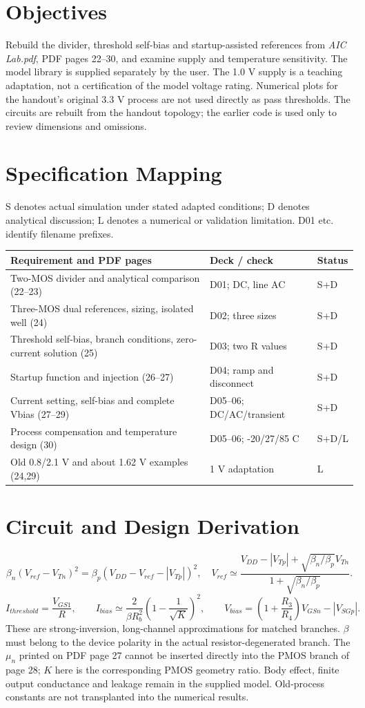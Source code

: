 \section{Objectives}
Rebuild the divider, threshold self-bias and startup-assisted references from \textit{AIC Lab.pdf}, PDF pages 22--30, and examine supply and temperature sensitivity. The model library is supplied separately by the user. The 1.0 V supply is a teaching adaptation, not a certification of the model voltage rating. Numerical plots for the handout's original 3.3 V process are not used directly as pass thresholds. The circuits are rebuilt from the handout topology; the earlier code is used only to review dimensions and omissions.

\section{Specification Mapping}
S denotes actual simulation under stated adapted conditions; D denotes analytical discussion; L denotes a numerical or validation limitation. D01 etc. identify filename prefixes.
\small\begin{longtable}{p{.46\linewidth}p{.30\linewidth}p{.15\linewidth}}\toprule
Requirement and PDF pages & Deck / check & Status \\ \midrule\endhead
Two-MOS divider and analytical comparison (22--23) & D01; DC, line AC & S+D \\
Three-MOS dual references, sizing, isolated well (24) & D02; three sizes & S+D \\
Threshold self-bias, branch conditions, zero-current solution (25) & D03; two R values & S+D \\
Startup function and injection (26--27) & D04; ramp and disconnect & S+D \\
Current setting, self-bias and complete Vbias (27--29) & D05--06; DC/AC/transient & S+D \\
Process compensation and temperature design (30) & D05--06; -20/27/85 C & S+D/L \\
Old 0.8/2.1 V and about 1.62 V examples (24,29) & 1 V adaptation & L \\
\bottomrule\end{longtable}\normalsize


\section{Circuit and Design Derivation}
\[
\beta_n(V_{ref}-V_{Tn})^2=\beta_p(V_{DD}-V_{ref}-|V_{Tp}|)^2,
\quad
V_{ref}\simeq\frac{V_{DD}-|V_{Tp}|+\sqrt{\beta_n/\beta_p}V_{Tn}}{1+\sqrt{\beta_n/\beta_p}}.
\]
\[
I_{threshold}=\frac{V_{GS1}}{R},\qquad
I_{bias}\simeq\frac{2}{\beta R_b^2}\left(1-\frac{1}{\sqrt K}\right)^2,
\qquad V_{bias}=\left(1+\frac{R_3}{R_4}\right)V_{GSn}-|V_{SGp}|.
\]These are strong-inversion, long-channel approximations for matched branches. $\beta$ must belong to the device polarity in the actual resistor-degenerated branch. The $\mu_n$ printed on PDF page 27 cannot be inserted directly into the PMOS branch of page 28; $K$ here is the corresponding PMOS geometry ratio. Body effect, finite output conductance and leakage remain in the supplied model. Old-process constants are not transplanted into the numerical results.


